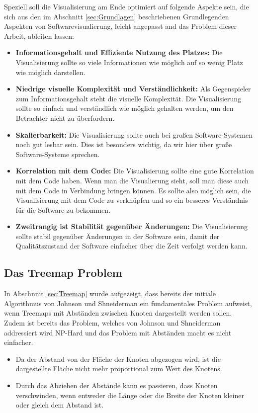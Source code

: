 Speziell soll die Visualisierung am Ende optimiert auf folgende Aspekte sein, die sich aus den im Abschnitt \ref{sec:Grundlagen} beschriebenen Grundlegenden Aspekten von Softwarevisualierung, leicht angepasst and das Problem dieser Arbeit, ableiten lassen: 

\begin{itemize}
    \item \textbf{Informationsgehalt und Effiziente Nutzung des Platzes:} Die Visualisierung sollte so viele Informationen wie möglich auf so wenig Platz wie möglich darstellen.
    \item \textbf{Niedrige visuelle Komplexität und Verständlichkeit:} Als Gegenspieler zum Informationsgehalt steht die visuelle Komplexität. Die Visualisierung sollte so einfach und verständlich wie möglich gehalten werden, um den Betrachter nicht zu überfordern.
    \item \textbf{Skalierbarkeit:} Die Visualisierung sollte auch bei großen Software-Systemen noch gut lesbar sein. Dies ist besonders wichtig, da wir hier über große Software-Systeme sprechen.
    \item \textbf{Korrelation mit dem Code:} Die Visualisierung sollte eine gute Korrelation mit dem Code haben. Wenn man die Visualierung sieht, soll man diese auch mit dem Code in Verbindung bringen können. Es sollte also möglich sein, die Visualisierung mit dem Code zu verknüpfen und so ein besseres Verständnis für die Software zu bekommen.
    \item \textbf{Zweitrangig ist Stabilität gegenüber Änderungen:} Die Visualisierung sollte stabil gegenüber Änderungen in der Software sein, damit der Qualitätszustand der Software einfacher über die Zeit verfolgt werden kann.
\end{itemize}


\subsection{Das Treemap Problem} \label{sec:TreemapProblem}
In Abschnnit \ref{sec:Treemap} wurde aufgezeigt, dass bereits der initiale Algorithmus von Johnson und Shneiderman \cite{johnson1991tree} ein fundamentales Problem aufweist, wenn Treemaps mit Abständen zwischen Knoten dargestellt werden sollen. Zudem ist bereits das Problem, welches von Johnson und Shneiderman addressiert wird NP-Hard \cite[3]{bruls2000squarified} und das Problem mit Abständen macht es nicht einfacher.
\begin{itemize}
    \item Da der Abstand von der Fläche der Knoten abgezogen wird, ist die dargestellte Fläche nicht mehr proportional zum Wert des Knotens.
    \item Durch das Abziehen der Abstände kann es passieren, dass Knoten verschwinden, wenn entweder die Länge oder die Breite der Knoten kleiner oder gleich dem Abstand ist.
\end{itemize}

